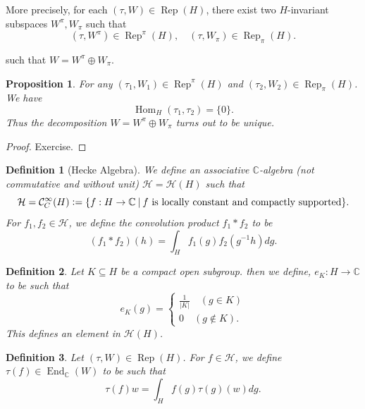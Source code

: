 \documentclass[8pt]{article}
\newtheorem{proposition}{Proposition}[section]
\newtheorem{definition}{Definition}[section]
\DeclareMathOperator{\Rep}{Rep}
\DeclareMathOperator{\Hom}{Hom}
\DeclareMathOperator{\End}{End}
\newcommand{\defeq}{\vcentcolon=}
\newcommand{\C}[0]{\mathbb{C}}
\newcommand{\sep}[0]{\:|\:}
\newcommand{\zero}[0]{\{0\}}
\begin{document}
More precisely, for each $(\tau,W)\in\Rep(H)$, there exist two $H$-invariant subspaces $W^\pi,W_\pi$ such that 
\begin{equation*}
  (\tau,W^\pi)\in\Rep^\pi(H),\quad (\tau,W_\pi)\in\Rep_\pi(H).
\end{equation*}

such that $W=W^\pi\oplus W_\pi$.

\begin{proposition}
For any $(\tau_1,W_1)\in\Rep^\pi(H)$ and $(\tau_2,W_2)\in\Rep_\pi(H)$. We have 
\begin{equation*}
  \Hom_H(\tau_1,\tau_2) = \zero.
\end{equation*}
Thus the decomposition $W = W^\pi\oplus W_\pi$ turns out to be unique.
\end{proposition}

\begin{proof}
  Exercise.
\end{proof}

\begin{definition}[Hecke Algebra]
  We define an associative $\C$-algebra (not commutative and without unit) $\mathcal{H}=\mathcal{H}(H)$ such that 
  \begin{equation*}
    \mathcal{H} = \mathcal{C}^\infty_C(H) \defeq \{f:H\to\C\sep \text{$f$ is locally constant and compactly supported}\}.
  \end{equation*}
  For $f_1,f_2\in\mathcal{H}$, we define the convolution product $f_1\ast f_2$ to be 
  \begin{equation*}
    (f_1\ast f_2)(h) = \int_H f_1(g)f_2(g^{-1}h)dg.
  \end{equation*}
\end{definition}

\begin{definition}
  Let $K\subseteq H$ be a compact open subgroup. then we define, $e_K:H\to\C$ to be such that 
  \begin{equation*}
    e_K(g) = \begin{cases}
      {\frac 1 {\vert K\vert}} \quad (g\in K)\\
      0\quad (g\not\in K).
    \end{cases}
  \end{equation*}
  This defines an element in $\mathcal{H}(H)$.
\end{definition}

\begin{definition}
  Let $(\tau,W)\in\Rep(H)$. For $f\in\mathcal{H}$, we define $\tau(f)\in\End_\C(W)$ to be such that 
  \begin{equation*}
    \tau(f)w = \int_H f(g)\tau(g)(w)dg.
  \end{equation*}
\end{definition}
\end{document}
